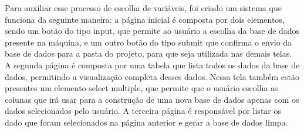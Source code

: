 Para auxiliar esse processo de escolha de variáveis, foi criado um sistema que funciona da seguinte maneira: a página inicial é composta por dois elementos, sendo um botão do tipo input, que permite ao usuário a escolha da base de dados presente na máquina, e um outro botão do tipo submit que confirma o envio da base de dados para a pasta do projeto, para que seja utilizada nas demais telas. A segunda página é composta por uma tabela que lista todos os dados da base de dados, permitindo a visualização completa desses dados. Nessa tela também estão presentes um elemento select multiple, que permite que o usuário escolha as colunas que irá usar para a construção de uma nova base de dados apenas com os dados selecionados pelo usuário. A terceira página é responsável por listar os dado que foram selecionados na página anterior e gerar a base de dados limpa.